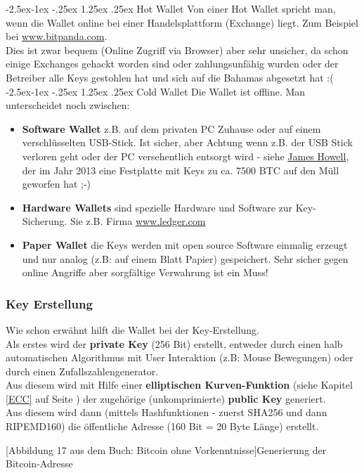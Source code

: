 \documentclass[10pt,a4paper,titlepage]{paper}
\makeatletter
\renewcommand\paragraph{\@startsection{paragraph}{4}{\z@}%
            {-2.5ex\@plus -1ex \@minus -.25ex}%
            {1.25ex \@plus .25ex}%
            {\normalfont\normalsize\bfseries}}
\makeatother
\begin{document}
\paragraph{Hot Wallet}
Von einer Hot Wallet spricht man, wenn die Wallet online bei einer Handelsplattform (Exchange) liegt. Zum Beispiel bei \href{https://www.bitpanda.com}{\color{blue}www.bitpanda.com}.\\
Dies ist zwar bequem (Online Zugriff via Browser) aber sehr unsicher, da schon einige Exchanges gehackt worden sind oder zahlungsunfähig wurden oder der Betreiber alle Keys gestohlen hat und sich auf die Bahamas abgesetzt hat :(
\paragraph{Cold Wallet}
Die Wallet ist offline. Man unterscheidet noch zwischen:
\begin{itemize}
\item \textbf{Software Wallet} z.B. auf dem privaten PC Zuhause oder auf einem verschlüsselten USB-Stick. Ist sicher, aber Achtung wenn z.B. der USB Stick verloren geht oder der PC versehentlich entsorgt wird - siehe \href{https://futurezone.at/digital-life/festplatte-7500-bitcoin-muellhalde-finden-james-howells/402088129}{\color{blue}James Howell}, der im Jahr 2013 eine Festplatte mit Keys zu ca. 7500 BTC auf den Müll geworfen hat ;-)
\item \textbf{Hardware Wallets} sind spezielle Hardware und Software zur Key-Sicherung. Sie z.B. Firma \href{https://www.ledger.com/}{\color{blue}www.ledger.com}
\item \textbf{Paper Wallet} die Keys werden mit open source Software einmalig erzeugt und nur analog (z.B: auf einem Blatt Papier) gespeichert. Sehr sicher gegen online Angriffe aber sorgfältige Verwahrung ist ein Muss! 
\end{itemize}
\subsubsection{Key Erstellung}
Wie schon erwähnt hilft die Wallet bei der Key-Erstellung.\\
Als erstes wird der \textbf{private Key} (256 Bit) erstellt, entweder durch einen halb automatischen Algorithmus mit User Interaktion (z.B: Mouse Bewegungen) oder durch einen Zufallszahlengenerator. \\
Aus diesem wird mit Hilfe einer \textbf{elliptischen Kurven-Funktion} (siehe Kapitel \ref{ECC} auf Seite \pageref{ECC}) der zugehörige (unkomprimierte) \textbf{public Key} generiert.\\
Aus diesem wird dann (mittels Hashfunktionen - zuerst SHA256 und dann RIPEMD160) die öffentliche Adresse (160 Bit = 20 Byte Länge) erstellt.
\begin{center}
[Abbildung 17 aus dem Buch: Bitcoin ohne Vorkenntnisse]{Generierung der Bitcoin-Adresse}
\end{center}
\end{document}
